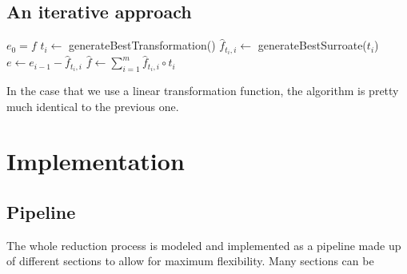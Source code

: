 \documentclass[
  a4paper,  %
  twoside,  %
  bibliography=totoc,
  headsepline,
  cleardoublepage=empty,
  parskip=half,
  draft=false
]{scrbook}
\begin{document}

\section{An iterative approach}

\begin{algorithm}[H]
\normalsize
\begin{algorithmic}
    \State $e_0 = f$
    	\State $t_i \gets$ generateBestTransformation()
    	\State $\hat{f}_{t_i,i} \gets$ generateBestSurroate($t_i$)
    	\State $e \gets e_{i - 1} - \hat{f}_{t_i,i}$
    \EndFor
    \State $\hat{f} \gets \sum_{i=1}^m \hat{f}_{t_i, i} \circ t_i$
    \State {}
\EndFunction
\end{algorithmic}
\end{algorithm}

In the case that we use a linear transformation function, the algorithm is pretty much identical to the previous one.

\chapter{Implementation}


\section{Pipeline}

The whole reduction process is modeled and implemented as a pipeline made up of different sections to allow for maximum flexibility.
Many sections can be
\end{document}
